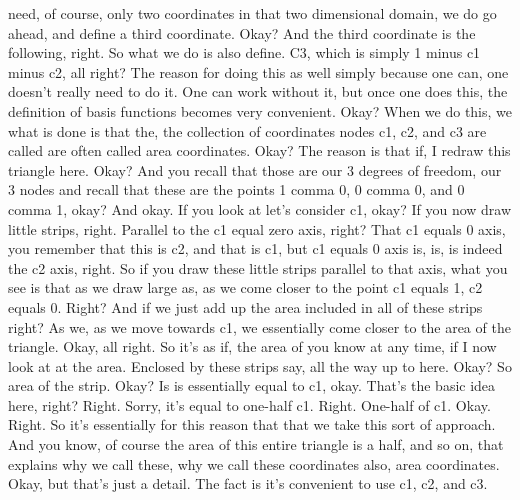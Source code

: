 \documentclass[10pt]{article}
\begin{document}
need, of course, only two coordinates in that two dimensional domain, we do go ahead, and define a third coordinate. Okay? And the third coordinate is the following, right. So what we do is also define. C3, which is simply 1 minus c1 minus c2, all right? The reason for doing this as well simply because one can, one doesn't really need to do it. One can work without it, but once one does this, the definition of basis functions becomes very convenient. Okay? When we do this, we what is done is that the, the collection of coordinates nodes c1, c2, and c3 are called are often called area coordinates. Okay? The reason is that if, I redraw this triangle here. Okay? And you recall that those are our 3 degrees of freedom, our 3 nodes and recall that these are the points 1 comma 0, 0 comma 0, and 0 comma 1, okay? And okay. If you look at let's consider c1, okay? If you now draw little strips, right. Parallel to the c1 equal zero axis, right? That c1 equals 0 axis, you remember that this is c2, and that is c1, but c1 equals 0 axis is, is, is indeed the c2 axis, right. So if you draw these little strips parallel to that axis, what you see is that as we draw large as, as we come closer to the point c1 equals 1, c2 equals 0. Right? And if we just add up the area included in all of these strips right? As we, as we move towards c1, we essentially come closer to the area of the triangle. Okay, all right. So it's as if, the area of you know at any time, if I now look at at the area. Enclosed by these strips say, all the way up to here. Okay? So area of the strip. Okay? Is is essentially equal to c1, okay. That's the basic idea here, right? Right. Sorry, it's equal to one-half c1. Right. One-half of c1. Okay. Right. So it's essentially for this reason that that we take this sort of approach. And you know, of course the area of this entire triangle is a half, and so on, that explains why we call these, why we call these coordinates also, area coordinates. Okay, but that's just a detail. The fact is it's convenient to use c1, c2, and c3.
\end{document}
